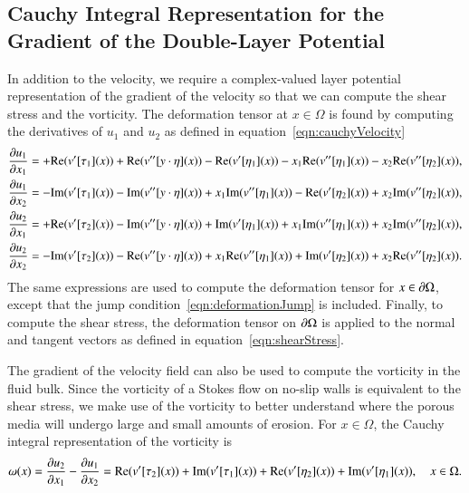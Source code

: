 \documentclass[preprint,10pt]{elsarticle}
\begin{document}
\subsection{Cauchy Integral Representation for the Gradient of the
Double-Layer Potential}
\label{sec:gradDLPcomplex}
In addition to the velocity, we require a complex-valued layer potential representation
of the gradient of the velocity so that we can compute the shear stress
and the vorticity.  The deformation tensor at $x \in \Omega$ is found by
computing the derivatives of $u_1$ and $u_2$ as defined in
equation~\eqref{eqn:cauchyVelocity}  
\begin{equation}
\label{eqn:cauchyGradient}
  \begin{aligned}
    \frac{\partial u_1}{\partial x_1} &= +{\operatorname{Re}} (v'[\tau_1](x)) + 
      {\operatorname{Re}} (v''[y\cdot\eta](x)) - {\operatorname{Re}} (v'[\eta_1](x)) - 
      x_1{\operatorname{Re}} (v''[\eta_1](x)) - x_2{\operatorname{Re}} (v''[\eta_2](x)), \\
    \frac{\partial u_1}{\partial x_2} &= - {\operatorname{Im}} (v'[\tau_1](x)) - 
      {\operatorname{Im}} (v''[y\cdot\eta](x)) + x_1{\operatorname{Im}} (v''[\eta_1](x)) - 
      {\operatorname{Re}} (v'[\eta_2](x)) + x_2{\operatorname{Im}} (v''[\eta_2](x)), \\
    \frac{\partial u_2}{\partial x_1} &= +{\operatorname{Re}} (v'[\tau_2](x)) - 
      {\operatorname{Im}} (v''[y\cdot\eta](x)) + {\operatorname{Im}} (v'[\eta_1](x)) +
      x_1{\operatorname{Im}} (v''[\eta_1](x)) + x_2{\operatorname{Im}} (v''[\eta_2](x)), \\
    \frac{\partial u_2}{\partial x_2} &= -{\operatorname{Im}} (v'[\tau_2](x)) - 
      {\operatorname{Re}} (v''[y\cdot\eta](x)) + x_1{\operatorname{Re}} (v''[\eta_1](x)) +
      {\operatorname{Im}} (v'[\eta_2](x)) + x_2{\operatorname{Re}} (v''[\eta_2](x)).
  \end{aligned}
\end{equation}
The same expressions are used to compute the deformation tensor for $x
\in {\partial}\Omega$, except that the jump
condition~\eqref{eqn:deformationJump} is included.  Finally, to compute
the shear stress, the deformation tensor on ${\partial}\Omega$ is applied to
the normal and tangent vectors as defined in
equation~\eqref{eqn:shearStress}.

The gradient of the velocity field can also be used to compute the
vorticity in the fluid bulk. Since the vorticity of a Stokes flow on
no-slip walls is equivalent to the shear stress, we make use of the
vorticity to better understand where the porous media will undergo large
and small amounts of erosion.  For $x \in \Omega$, the Cauchy integral
representation of the vorticity is
\begin{align}
  \omega(x) = \frac{\partial u_2}{\partial x_1} - \frac{\partial u_1}{\partial x_2} = 
{\operatorname{Re}} (v'[\tau_2](x)) + {\operatorname{Im}} (v'[\tau_1](x)) 
 + {\operatorname{Re}} (v'[\eta_2](x))+ {\operatorname{Im}} (v'[\eta_1](x)), \quad x \in \Omega.
\end{align}
\end{document}
